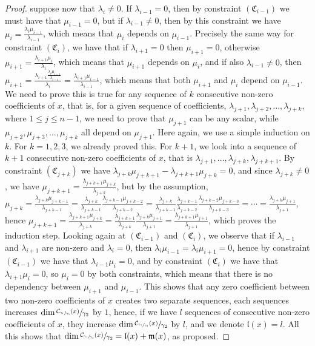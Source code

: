 \documentclass[12pt,fleqn]{article}
\begin{document}
\begin{proof}
suppose now that $\lambda_i\neq 0$. If $\lambda_{i-1}=0$, then by constraint $(\mathfrak{C}_{i-1})$ we must have that $\mu_{i-1}=0$, but if $\lambda_{i-1}\neq 0$, then by this constraint we have $\mu_i=\frac{\lambda_i\mu_{i-1}}{\lambda_{i-1}}$, which means that $\mu_i$ depends on $\mu_{i-1}$. Precisely the same way for constraint $(\mathfrak{C}_i)$, we have that if $\lambda_{i+1}=0$ then $\mu_{i+1}=0$, otherwise $\mu_{i+1}=\frac{\lambda_{i+1}\mu_i}{\lambda_i}$, which means that $\mu_{i+1}$ depends on $\mu_i$, and if also $\lambda_{i-1}\neq 0$, then $\mu_{i+1}=\frac{\lambda_{i+1}\frac{\lambda_i\mu_{i-1}}{\lambda_{i-1}}}{\lambda_i}=\frac{\lambda_{i+1}\mu_{i-1}}{\lambda_{i-1}}$, which means that both $\mu_{i+1}$ and $\mu_i$ depend on $\mu_{i-1}$. We need to prove this is true for any sequence of $k$ consecutive non-zero coefficients of $x$, that is, for a given sequence of coefficients, $\lambda_{j+1},\lambda_{j+2},\dots,\lambda_{j+k}$, where $1\leq j\leq n-1$, we need to prove that $\mu_{j+1}$ can be any scalar, while $\mu_{j+2},\mu_{j+3},\dots,\mu_{j+k}$ all depend on $\mu_{j+1}$. Here again, we use a simple induction on $k$. For $k=1,2,3$, we already proved this. For $k+1$, we look into a sequence of $k+1$ consecutive non-zero coefficients of $x$, that is $\lambda_{j+1},\dots,\lambda_{j+k},\lambda_{j+k+1}$. By constraint $(\mathfrak{C}_{j+k})$ we have $\lambda_{j+k}\mu_{j+k+1}-\lambda_{j+k+1}\mu_{j+k}=0$, and since $\lambda_{j+k}\neq 0$, we have $\mu_{j+k+1}=\frac{\lambda_{j+k+1}\mu_{j+k}}{\lambda_{j+k}}$, but by the assumption, $\mu_{j+k}=\frac{\lambda_{j+k}\mu_{j+k-1}}{\lambda_{j+k-1}}=\frac{\lambda_{j+k}}{\lambda_{j+k-1}}\frac{\lambda_{j+k-1}\mu_{j+k-2}}{\lambda_{j+k-2}}=\frac{\lambda_{j+k}}{\lambda_{j+k-1}}\frac{\lambda_{j+k-1}}{\lambda_{j+k-2}}\frac{\lambda_{j+k-2}\mu_{j+k-3}}{\lambda_{j+k-3}}=\cdots=\frac{\lambda_{j+k}\mu_{j+1}}{\lambda_{j+1}}$, hence $\mu_{j+k+1}=\frac{\lambda_{j+k+1}\mu_{j+k}}{\lambda_{j+k}}=\frac{\lambda_{j+k+1}}{\lambda_{j+k}}\frac{\lambda_{j+k}\mu_{j+1}}{\lambda_{j+1}}=\frac{\lambda_{j+k+1}\mu_{j+1}}{\lambda_{j+1}}$, which proves the induction step. Looking again at $(\mathfrak{C}_{i-1})$ and $(\mathfrak{C}_i)$, we observe that if $\lambda_{i-1}$ and $\lambda_{i+1}$ are non-zero and $\lambda_i=0$, then $\lambda_i\mu_{i-1}=\lambda_i\mu_{i+1}=0$, hence by constraint $(\mathfrak{C}_{i-1})$ we have that $\lambda_{i-1}\mu_i=0$, and by constraint $(\mathfrak{C}_i)$ we have that $\lambda_{i+1}\mu_i=0$, so $\mu_i=0$ by both constraints, which means that there is no dependency between $\mu_{i+1}$ and $\mu_{i-1}$. This shows that any zero coefficient between two non-zero coefficients of $x$ creates two separate sequences, each sequences increases $\dim\sfrac{\mathcal{C}_{\sfrac{\gamma_1}{\gamma_3}}(x)}{\gamma_2}$ by $1$, hence, if we have $l$ sequences of consecutive non-zero coefficients of $x$, they increase $\dim\sfrac{\mathcal{C}_{\sfrac{\gamma_1}{\gamma_3}}(x)}{\gamma_2}$ by $l$, and we denote $\mathfrak{l}(x)=l$. All this shows that $\dim\sfrac{\mathcal{C}_{\sfrac{\gamma_1}{\gamma_3}}(x)}{\gamma_2}=\mathfrak{l}(x)+\mathfrak{m}(x)$, as proposed.
\end{proof}
\end{document}
